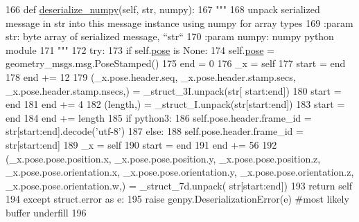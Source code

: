 \begin{DoxyCode}
166   \textcolor{keyword}{def }\hyperlink{classjaco__msgs_1_1msg_1_1__ArmPoseGoal_1_1ArmPoseGoal_a9ec47f02e84e07468afdaa72760944e8}{deserialize\_numpy}(self, str, numpy):
167     \textcolor{stringliteral}{"""}
168 \textcolor{stringliteral}{    unpack serialized message in str into this message instance using numpy for array types}
169 \textcolor{stringliteral}{    :param str: byte array of serialized message, ``str``}
170 \textcolor{stringliteral}{    :param numpy: numpy python module}
171 \textcolor{stringliteral}{    """}
172     \textcolor{keywordflow}{try}:
173       \textcolor{keywordflow}{if} self.\hyperlink{classjaco__msgs_1_1msg_1_1__ArmPoseGoal_1_1ArmPoseGoal_ad25889b3ba293b0eba280014befdc9a6}{pose} \textcolor{keywordflow}{is} \textcolor{keywordtype}{None}:
174         self.\hyperlink{classjaco__msgs_1_1msg_1_1__ArmPoseGoal_1_1ArmPoseGoal_ad25889b3ba293b0eba280014befdc9a6}{pose} = geometry\_msgs.msg.PoseStamped()
175       end = 0
176       \_x = self
177       start = end
178       end += 12
179       (\_x.pose.header.seq, \_x.pose.header.stamp.secs, \_x.pose.header.stamp.nsecs,) = \_struct\_3I.unpack(str[
      start:end])
180       start = end
181       end += 4
182       (length,) = \_struct\_I.unpack(str[start:end])
183       start = end
184       end += length
185       \textcolor{keywordflow}{if} python3:
186         self.pose.header.frame\_id = str[start:end].decode(\textcolor{stringliteral}{'utf-8'})
187       \textcolor{keywordflow}{else}:
188         self.pose.header.frame\_id = str[start:end]
189       \_x = self
190       start = end
191       end += 56
192       (\_x.pose.pose.position.x, \_x.pose.pose.position.y, \_x.pose.pose.position.z, 
      \_x.pose.pose.orientation.x, \_x.pose.pose.orientation.y, \_x.pose.pose.orientation.z, \_x.pose.pose.orientation.w,) = \_struct\_7d.unpack(
      str[start:end])
193       \textcolor{keywordflow}{return} self
194     \textcolor{keywordflow}{except} struct.error \textcolor{keyword}{as} e:
195       \textcolor{keywordflow}{raise} genpy.DeserializationError(e) \textcolor{comment}{#most likely buffer underfill}
196 
\end{DoxyCode}
